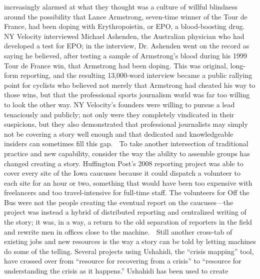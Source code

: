 increasingly alarmed at what they thought was a culture of willful
blindness around the possibility that Lance Armstrong, seven-time
winner of the Tour de France, had been doping with Erythropoietin,
or EPO, a blood-boosting drug. NY Velocity interviewed Michael
Ashenden, the Australian physician who had developed a test for
EPO; in the interview, Dr. Ashenden went on the record as saying
he believed, after testing a sample of Armstrong’s blood during his
1999 Tour de France win, that Armstrong had been doping. This
was original, long-form reporting, and the resulting 13,000-word
interview became a public rallying point for cyclists who believed
not merely that Armstrong had cheated his way to those wins, but
that the professional sports journalism world was far too willing to
look the other way. NY Velocity’s founders were willing to pursue a
lead tenaciously and publicly; not only were they completely vindicated
in their suspicions, but they also demonstrated that professional
journalists may simply not be covering a story well enough and that
dedicated and knowledgeable insiders can sometimes fill this gap.
 To take another intersection of traditional practice and new capability,
consider the way the ability to assemble groups has changed
creating a story. Huffington Post’s 2008 reporting project was able
to cover every site of the Iowa caucuses because it could dispatch
a volunteer to each site for an hour or two, something that would
have been too expensive with freelancers and too travel-intensive for
full-time staff. The volunteers for Off the Bus were not the people
creating the eventual report on the caucuses—the project was instead
a hybrid of distributed reporting and centralized writing of the story;
it was, in a way, a return to the old separation of reporters in the field
and rewrite men in offices close to the machine.
 Still another cross-tab of existing jobs and new resources is the way a
story can be told by letting machines do some of the telling. Several
projects using Ushahidi, the ``crisis mapping'' tool, have crossed over
from ``resource for recovering from a crisis'' to ``resource for understanding
the crisis as it happens.'' Ushahidi has been used to create

